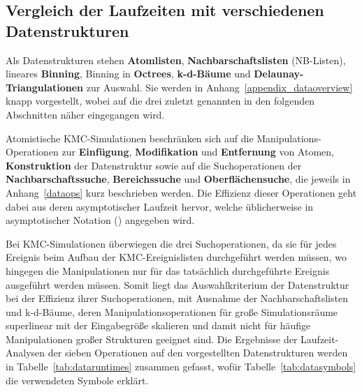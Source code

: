 \subsection{Vergleich der Laufzeiten mit verschiedenen Datenstrukturen}

Als Datenstrukturen stehen \textbf{Atomlisten}, \textbf{Nachbarschaftslisten} (NB-Listen), lineares \textbf{Binning}, Binning in \textbf{Octrees}, \textbf{k-d-Bäume} und \textbf{Delaunay-Triangulationen} zur Auswahl\cite{skiena_algorithm_2010,press_numerical_2007}.
Sie werden in Anhang~\ref{appendix_dataoverview} knapp vorgestellt, wobei auf die drei zuletzt genannten in den folgenden Abschnitten näher eingegangen wird.

Atomistische KMC-Simulationen beschränken sich auf die Manipulations-Operationen zur \textbf{Einfügung}, \textbf{Modifikation} und \textbf{Entfernung} von Atomen, \textbf{Konstruktion} der Datenstruktur sowie auf die Suchoperationen der \textbf{Nachbarschaftssuche}, \textbf{Bereichssuche} und \textbf{Oberflächensuche}, die jeweils in Anhang~\ref{dataops} kurz beschrieben werden.
Die Effizienz dieser Operationen geht dabei aus deren asymptotischer Laufzeit hervor, welche üblicherweise in asymptotischer Notation (\BigO{}) angegeben wird.

Bei KMC-Simulationen überwiegen die drei Suchoperationen, da sie für jedes Ereignis beim Aufbau der KMC-Ereignislisten durchgeführt werden müssen, wo hingegen die Manipulationen nur für das tatsächlich durchgeführte Ereignis ausgeführt werden müssen.
Somit liegt das Auswahlkriterium der Datenstruktur bei der Effizienz ihrer Suchoperationen, mit Ausnahme der Nachbarschaftslisten und k-d-Bäume, deren Manipulationsoperationen für große Simulationsräume superlinear mit der Eingabegröße skalieren und damit nicht für häufige Manipulationen großer Strukturen geeignet sind.
Die Ergebnisse der Laufzeit-Analysen der sieben Operationen auf den vorgestellten Datenstrukturen werden in Tabelle~\ref{tab:dataruntimes} zusammen gefasst, wofür Tabelle~\ref{tab:datasymbols} die verwendeten Symbole erklärt.

